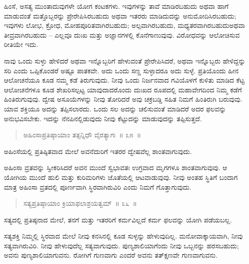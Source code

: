 \vspace{-0.3cm}

ಹಿಂಸೆ, ಅಸತ್ಯ ಮುಂತಾದುವುಗಳೇ ಯೋಗ ಕಂಟಕಗಳು. ಇವುಗಳನ್ನು ತಾವೆ ಮಾಡಿರಬಹುದು ಅಥವಾ ಹಾಗೆ ಮಾಡುವಂತೆ ಮತ್ತೊಬ್ಬರನ್ನು ಪ್ರೇರೇಪಿಸಿರಬಹುದು ಅಥವಾ ಇತರರು ಮಾಡಿದುದನ್ನು ಅನುಮೋದಿಸಿರಬಹುದು; ಇವುಗಳು ಲೋಭ, ಕ್ರೋಧ, ಮೋಹಪೂರಿತವಾಗಿರಬಹುದು; ಅಲ್ಪವಾಗಿರಬಹುದು, ಮಧ್ಯತರವಾಗಿರಬಹುದು\break ಅಥವಾ ತೀವ್ರವಾಗಿರಬಹುದು – ಎಲ್ಲವೂ ದುಃಖ ಮತ್ತು ಅಜ್ಞಾನಗಳಲ್ಲಿ ಕೊನೆಗಾಣುವುವು. ವಿರೋಧವನ್ನು ಆಲೋಚಿಸುವ ರೀತಿಯೇ ಇದು. 

ನಾವು ಒಂದು ಸುಳ್ಳು ಹೇಳಿದರೆ ಅಥವಾ ಇನ್ನೊಬ್ಬರಿಗೆ ಹೇಳುವಂತೆ ಪ್ರೇರೇಪಿಸಿದರೆ, ಅಥವಾ ಇನ್ನೊಬ್ಬರು ಹೇಳಿದ್ದನ್ನು ಸರಿ ಎಂದು ಒಪ್ಪಿಕೊಂಡರೆ ಅಷ್ಟೂ ಪಾತಕವೇ. ಅದು ಒಂದು ಸಣ್ಣ ಸುಳ್ಳಾದರೂ ಅದು ಸುಳ್ಳೆ. ಪ್ರತಿಯೊಂದು ಹೀನ ಆಲೋಚನೆಯೂ ಕೂಡ ನಮ್ಮ ಕಡೆ ತಿರುಗುವುದು. ನೀವು ಒಂದು ನಿರ್ಜನವಾದ ಗವಿಯೊಳಗೆ ಕುಳಿತು ಮಾಡಿದ ಕೆಟ್ಟ ಆಲೋಚನೆಗಳೂ ಕೂಡ ಶೇಖರಿಸಲ್ಪಟ್ಟ ಯಾವುದಾದರೊಂದು ದುಃಖದ ರೂಪದಲ್ಲಿ ಮಹಾವೇಗದಿಂದ ನಿಮ್ಮ ಕಡೆಗೆ ಹಿಂತಿರುಗುವುವು. ದ್ವೇಷ ಅಸೂಯೆಗಳನ್ನು ನೀವು ತೋರಿದರೆ ಅವು ಚಕ್ರಬಡ್ಡಿ ಸಹಿತ ನಿಮಗೆ ಹಿಂತಿರುಗಿ ಬರುವುವು. ಯಾವ ಶಕ್ತಿಯೂ ಅದನ್ನು ತಪ್ಪಿಸಲಾರದು. ಒಂದು ಸಲ ಅದನ್ನು ಚಲಿಸುವಂತೆ ಮಾಡಿದರೆ ಅದರ ಫಲವನ್ನು ಅನುಭವಿಸಬೇಕು. ಇದನ್ನು ನೆನಪಿನಲ್ಲಿಡುವುದು ನೀವು ಕೆಟ್ಟುದನ್ನು ಮಾಡುವುದನ್ನು ತಪ್ಪಿಸುತ್ತದೆ. 

\vspace{-0.3cm}

\begin{verse}
ಅಹಿಂಸಾಪ್ರತಿಷ್ಠಾಯಾಂ ತತ್ಸನ್ನಿಧೌ ವೈರತ್ಯಾಗಃ~॥ ೩೫~॥
\end{verse}

\vspace{-0.3cm}

ಅಹಿಂಸೆಯಲ್ಲಿ ಪ್ರತಿಷ್ಠಿತವಾದ ಮೇಲೆ ಅವನೆದುರಿಗೆ ಇತರರ ದ್ವೇಷವೆಲ್ಲ ಶಾಂತವಾಗುವುದು. 

ಅಹಿಂಸಾ ವ್ರತವನ್ನು ಸ್ವೀಕರಿಸಿದರೆ ಅವನ ಮುಂದೆ ಸ್ವಭಾವತಃ ಉಗ್ರವಾದ ಮೃಗಗಳೂ ಶಾಂತವಾಗುವುವು. ಆ ಯೋಗಿಯ ಮುಂದೆ ಹುಲಿ ಮತ್ತು ಕುರಿಮರಿಗಳು ಜೊತೆಯಲ್ಲಿ ಆಟವಾಡುವುವು. ನೀವು ಅಂತಹ ಸ್ಥಿತಿಗೆ ಬಂದಾಗ ಮಾತ್ರ ಅಹಿಂಸಾ ವ್ರತದಲ್ಲಿ ಪೂರ್ಣವಾಗಿ ಸ್ಥಿರವಾಗಿರುವಿರಿ ಎಂದು ನಿಮಗೆ ಗೊತ್ತಾಗುವುದು. 

\vspace{-0.35cm}

\begin{verse}
ಸತ್ಯಪ್ರತಿಷ್ಠಾಯಾಂ ಕ್ರಿಯಾಫಲಾಶ್ರಯತ್ವಮ್​~॥ ೩೬~॥
\end{verse}

\vspace{-0.35cm}

ಸತ್ಯದಲ್ಲಿ ಪ್ರತಿಷ್ಠನಾದ ಮೇಲೆ, ತನಗೆ ಮತ್ತು ಇತರರಿಗೆ ಕರ್ಮವಿಲ್ಲದೆ ಕರ್ಮ ಫಲವನ್ನು ಯೋಗಿ ಪಡೆಯಬಲ್ಲ. 

ಸತ್ಯಶಕ್ತಿ ನಿಮ್ಮಲ್ಲಿ ಸ್ಥಿರವಾದ ಮೇಲೆ ನೀವು ಕನಸಿನಲ್ಲಿ ಕೂಡ ಸುಳ್ಳನ್ನು ಹೇಳುವುದಿಲ್ಲ. ಮನೋವಾಕ್ಕಾಯವಾಗಿ, ನೀವು ಸತ್ಯವಾಗಿರುವಿರಿ. ನೀವು ಹೇಳುವುದೆಲ್ಲ ಸತ್ಯವಾಗುವುದು. ಪುಣ್ಯಶಾಲಿಯಾಗೆಂದು ನೀವು ಒಬ್ಬನನ್ನು ಹರಸಬಹುದು; ಅವನು ಪುಣ್ಯಶಾಲಿಯಾಗುವನು. ರೋಗಿಗೆ ಗುಣವಾಗು ಎಂದರೆ ಅವನು ತತ್​ಕ್ಷಣವೇ ಗುಣವಾಗುವನು. 

